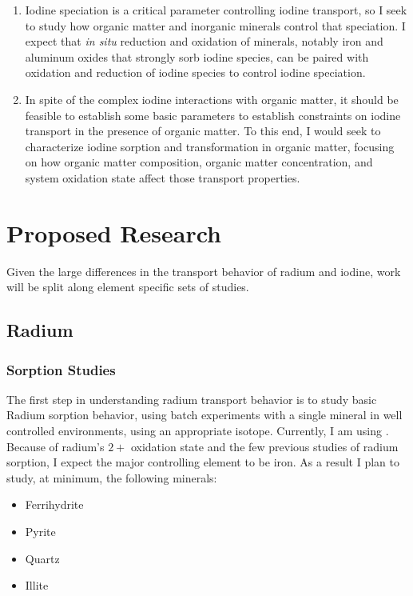 \documentclass[twoside,12pt,titlepage]{article}
\newcommand{\isotope}[2]{\ch{^{#1}#2}}
\begin{document}
\begin{enumerate}[label = \arabic*)]
	\item Iodine speciation is a critical parameter controlling iodine transport, so I seek to study how organic matter and inorganic minerals control that speciation. I expect that \textit{in situ} reduction and oxidation of minerals, notably iron and aluminum oxides that strongly sorb iodine species, can be paired with oxidation and reduction of iodine species to control iodine speciation.
	\item In spite of the complex iodine interactions with organic matter, it should be feasible to establish some basic parameters to establish constraints on iodine transport in the presence of organic matter. To this end, I would seek to characterize iodine sorption and transformation in organic matter, focusing on how organic matter composition, organic matter concentration, and system oxidation state affect those transport properties.

\end{enumerate}

\section{Proposed Research}

Given the large differences in the transport behavior of radium and iodine, work will be split along element specific sets of studies.

\subsection{Radium}

\subsubsection{Sorption Studies}
The first step in understanding radium transport behavior is to study basic Radium sorption behavior, using batch experiments with a single mineral in well controlled environments, using an appropriate isotope. Currently, I am using \isotope{226}{Ra}. Because of radium's $2+$ oxidation state and the few previous studies of radium sorption, I expect the major controlling element to be iron. As a result I plan to study, at minimum, the following minerals:

\begin{itemize}
	\item Ferrihydrite
	\item Pyrite
	\item Quartz
	\item Illite
\end{itemize}
\end{document}
